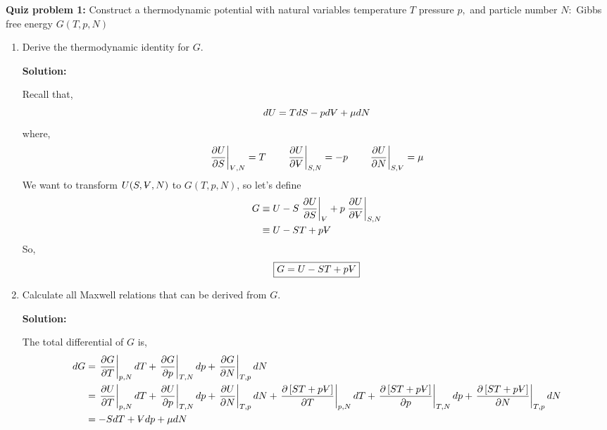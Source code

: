 \documentclass[10pt]{article}
\newenvironment{Solution}
    {\textbf{Solution:}
    
    \vspace{5mm}
    \begin{tcolorbox}
    }
    {
    \end{tcolorbox}
    \vspace{5mm}
    }
\newcommand{\vol}{{\ooalign{\hfil$V$\hfil\cr\kern0.08em--\hfil\cr}}}
\begin{document}
\noindent\textbf{Quiz problem 1:} Construct a thermodynamic potential with natural variables temperature $T$ pressure $p,$ and particle number $N:$ Gibbs free energy $G(T, p, N)$
\begin{enumerate}
\item Derive the thermodynamic identity for $G$.

\begin{Solution}
Recall that,
\begin{equation}
    dU = TdS - pd\vol +\mu dN 
\end{equation}
where,
\begin{equation}
    \left.\frac{\partial U}{\partial S}\right|_{\scriptsize{\vol}, N} = T \qquad \left.\frac{\partial U}{\partial \vol}\right|_{S, N} = -p \qquad \left.\frac{\partial U}{\partial N}\right|_{\scriptsize{S,\vol}} = \mu  
\end{equation}
We want to transform $U(S,\vol,N)$ to $G(T, p, N)$, so let's define 
\begin{align}
    G&\equiv U - S\left.\frac{\partial U}{\partial S}\right|_{\scriptsize{\vol}}  + p\left.\frac{\partial U}{\partial \vol}\right|_{S, N}\\
    &\equiv U - ST + p\vol 
\end{align}  
So,
\begin{equation}
    \boxed{
    G = U - ST + p\vol 
    }
\end{equation}
\end{Solution}

\item Calculate all Maxwell relations that can be derived from $G$.

\begin{Solution}
The total differential of $G$ is,
\begin{align}
    dG &= \left.\frac{\partial G}{\partial T}\right|_{p, N} dT + \left.\frac{\partial G}{\partial p}\right|_{T, N} dp + \left.\frac{\partial G}{\partial N}\right|_{T, p} dN\\
    &= \left.\frac{\partial U}{\partial T}\right|_{p, N} dT + \left.\frac{\partial U}{\partial p}\right|_{T, N} dp + \left.\frac{\partial U}{\partial N}\right|_{T, p} dN + \left.\frac{\partial \left[ST + p\vol\right]}{\partial T}\right|_{p, N} dT + \left.\frac{\partial \left[ST + p\vol\right]}{\partial p}\right|_{T, N} dp + \left.\frac{\partial \left[ST + p\vol\right]}{\partial N}\right|_{T, p} dN\\
    &= -S dT +\vol dp +\mu dN
\end{align}


\end{Solution}
\end{enumerate}
\end{document}
